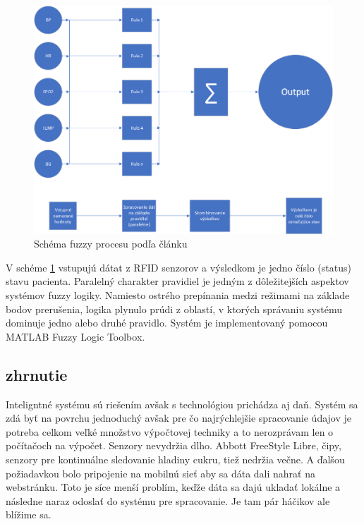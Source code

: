  \begin{figure}[h]
\includegraphics[scale=0.5]{rule-based-engine.png}
\caption{Schéma fuzzy procesu podľa článku\cite{2019}}
\label{fuzzy}
\end{figure}

V schéme \ref{fuzzy} vstupujú dátat z RFID senzorov a výsledkom je jedno číslo (status) stavu pacienta. Paralelný charakter pravidiel je jedným z dôležitejších aspektov systémov fuzzy logiky. Namiesto ostrého prepínania medzi režimami na základe bodov prerušenia, logika plynulo prúdi z oblastí, v ktorých správaniu systému dominuje jedno alebo druhé pravidlo. Systém je implementovaný pomocou MATLAB Fuzzy Logic Toolbox. \cite{2019}

\subsection{zhrnutie}
Inteligntné systému sú riešením avšak s technológiou prichádza aj daň. Systém sa zdá byť na povrchu jednoduchý avšak pre čo najrýchlejšie spracovanie údajov je potreba celkom veľké množstvo výpočtovej techniky a to nerozprávam len o počítačoch na výpočet. Senzory nevydržia dlho. Abbott FreeStyle Libre, čipy, senzory pre kontinuálne sledovanie hladiny cukru, tiež nedržia večne. A ďalšou požiadavkou bolo pripojenie na mobilnú sieť aby sa dáta dali nahrať na webstránku. Toto je síce menší problím, keďže dáta sa dajú ukladať lokálne a následne naraz odoslať do systému pre spracovanie. Je tam pár háčikov ale blížime sa.